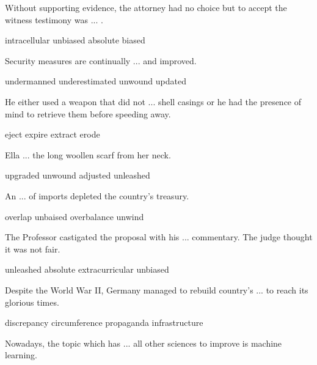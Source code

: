 \documentclass{exam}
\begin{document}
\begin{questions}
\question Without supporting evidence, the attorney had no choice but to accept the witness testimony was ... .
\\
\begin{oneparchoices} 
\choice intracellular
 \choice unbiased
\correctchoice absolute
 \choice biased 
\end{oneparchoices}
\question Security measures are continually ... and improved.\\
\begin{oneparchoices}
\choice undermanned
\choice underestimated
\choice unwound
\correctchoice updated
\end{oneparchoices}
\question He either used a weapon that did not ... shell casings or he had the presence of mind to retrieve them before speeding away.\\
\begin{oneparchoices}
\correctchoice eject
\choice expire
\choice extract
\choice erode
\end{oneparchoices}
\question Ella ... the long woollen scarf from her neck.\\
\begin{oneparchoices}
\choice upgraded
\correctchoice unwound
\choice adjusted
\choice unleashed
\end{oneparchoices}
\question An ... of imports depleted the country's treasury.\\
\begin{oneparchoices}
\choice overlap
\choice unbaised
\correctchoice overbalance
\choice unwind
\end{oneparchoices}
\question The Professor castigated the proposal with his ... commentary. The judge thought it was not fair.\\
\begin{oneparchoices} 
\choice unleashed
\choice absolute
\choice extracurricular
\correctchoice unbiased
\end{oneparchoices}

\question Despite the World War II, Germany managed to rebuild country's ... to reach its glorious times.\\
\begin{oneparchoices}
 \choice discrepancy
 \choice circumference
 \choice propaganda
 \correctchoice infrastructure
\end{oneparchoices}



\question Nowadays, the topic which has ... all other sciences to improve is machine learning.\\
\begin{oneparchoices}
 

\end{oneparchoices}
\end{questions}
\end{document}
